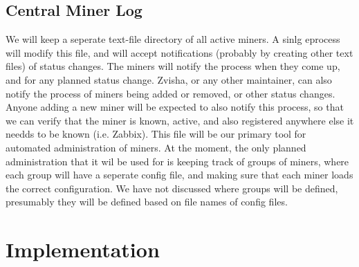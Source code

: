 \subsection{Central Miner Log}
We will keep a seperate text-file directory of all active miners. A sinlg eprocess will modify this file, and will accept notifications (probably by creating other text files) of status changes.
The miners will notify the process when they come up, and for any planned status change.
Zvisha, or any other maintainer, can also notify the process of miners being added or removed, or other status changes.
Anyone adding a new miner will be expected to also notify this process, so that we can verify that the miner is known, active, and also registered anywhere else it needds to be known (i.e. Zabbix).
This file will be our primary tool for automated administration of miners.
At the moment, the only planned administration that it wil be used for is keeping track of groups of miners, where each group will have a seperate config file, and making sure that each miner loads the correct configuration.
We have not discussed where groups will be defined, presumably they will be defined based on file names of config files.


\section{Implementation}
